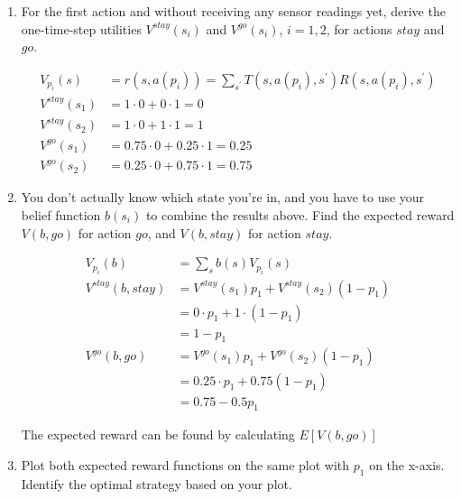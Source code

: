 \documentclass[12pt]{article}
\begin{document}
\begin{enumerate}

\item For the first action and without receiving any sensor readings
  yet, derive the one-time-step utilities $V^{stay}(s_i)$ and
  $V^{go}(s_i)$, $i=1,2$, for actions $stay$ and $go$.

\begin{align*}
  V_{p_{i}}(s) &= r(s,a(p_{i})) = \sum_{s^{\prime}}T(s,a(p_{i}),s^{\prime})R(s,a(p_{i}),s^{\prime})\\
  V^{stay}(s_{1}) &= 1\cdot 0 + 0\cdot 1 = 0\\
  V^{stay}(s_{2}) &= 1\cdot 0 + 1 \cdot 1 = 1\\
  V^{go}(s_{1}) &= 0.75 \cdot 0 + 0.25 \cdot 1 = 0.25\\
  V^{go}(s_{2}) &= 0.25\cdot 0 + 0.75 \cdot 1 = 0.75
\end{align*}

\item You don't actually know which state you're in, and you have to
  use your belief function $b(s_i)$ to combine the results above.
  Find the expected reward $V(b,go)$ for action $go$, and $V(b,stay)$
  for action $stay$.

\begin{align*}
  V_{p_{i}}(b) &= \sum_{s}b(s)V_{p_{i}}(s)\\
  V^{stay}(b,stay) &= V^{stay}(s_{1})p_{1} + V^{stay}(s_{2})(1-p_{1})\\
                  &= 0\cdot p_{1} + 1 \cdot (1 - p_{1})\\
                  &= 1 - p_{1}\\
  V^{go}(b,go) &= V^{go}(s_{1})p_{1} + V^{go}(s_{2})(1 - p_{1})\\
              &= 0.25\cdot p_{1} + 0.75(1 - p_{1})\\
              &= 0.75 - 0.5p_{1}
\end{align*}

The expected reward can be found by calculating $E[V(b,go)]$


\item Plot both expected reward functions on the same plot with $p_1$
  on the x-axis.  Identify the optimal strategy based on your plot.

\begin{centering}
\end{centering}


\end{enumerate}
\end{document}
